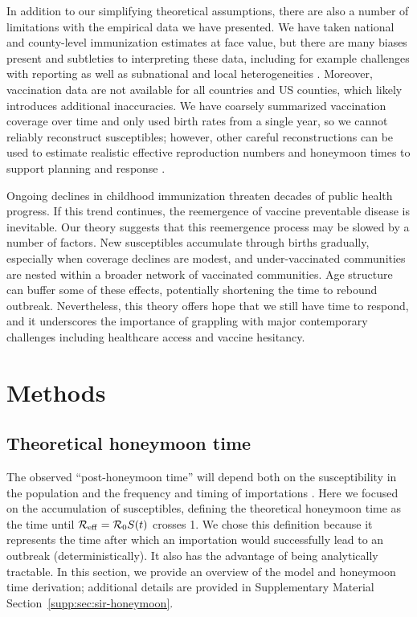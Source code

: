 In addition to our simplifying theoretical assumptions, there are also a number of limitations with the empirical data we have presented. We have taken national and county-level immunization estimates at face value, but there are many biases present and subtleties to interpreting these data, including for example challenges with reporting as well as subnational and local heterogeneities \citep{ChenBento2026}. Moreover, vaccination data are not available for all countries and US counties, which likely introduces additional inaccuracies. We have coarsely summarized vaccination coverage over time and only used birth rates from a single year, so we cannot reliably reconstruct susceptibles; however, other careful reconstructions can be used to estimate realistic effective reproduction numbers and honeymoon times to support planning and response \citep{ChenBento2026}. 

Ongoing declines in childhood immunization threaten decades of public health progress. If this trend continues, the reemergence of vaccine preventable disease is inevitable. Our theory suggests that this reemergence process may be slowed by a number of factors. New susceptibles accumulate through births gradually, especially when coverage declines are modest, and under-vaccinated communities are nested within a broader network of vaccinated communities. Age structure can buffer some of these effects, potentially shortening the time to rebound outbreak. Nevertheless, this theory offers hope that we still have time to respond, and it underscores the importance of grappling with major contemporary challenges including healthcare access and vaccine hesitancy.

\section{Methods}
\label{sec:methods}

\subsection{Theoretical honeymoon time}
\label{sec:methods-theoretical-honeymoon}

The observed ``post-honeymoon time'' will depend both on the susceptibility in the population and the frequency and timing of importations \citep{MetcalfEtAl2020}. Here we focused on the accumulation of susceptibles, defining the theoretical honeymoon time as the time until $\mathcal{R}_{\mathrm{eff}}=\mathcal{R}_{0} S(t)$ crosses 1. We chose this definition because it represents the time after which an importation would successfully lead to an outbreak (deterministically). It also has the advantage of being analytically tractable. In this section, we provide an overview of the model and honeymoon time derivation; additional details are provided in Supplementary Material Section~\ref{supp:sec:sir-honeymoon}.

